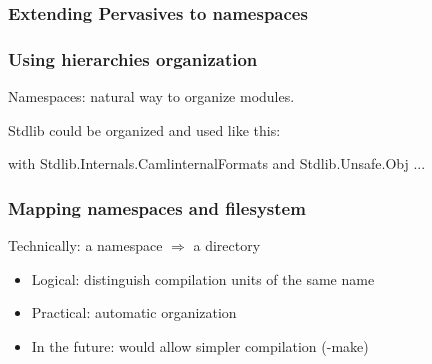 \documentclass{beamer}
\begin{document}
\begin{frame}[fragile]
\frametitle{Extending Pervasives to namespaces}






\end{frame}

\begin{frame}[fragile]
\frametitle{Using hierarchies organization}
Namespaces: natural way to organize modules.

\medskip
\pause

Stdlib could be organized and used like this:
\begin{OCaml}
with Stdlib.Internals.CamlinternalFormats
and Stdlib.Unsafe.Obj
...
\end{OCaml}
\end{frame}

\begin{frame}
\frametitle{Mapping namespaces and filesystem}

Technically: a namespace $\Rightarrow$ a directory

\medskip

\pause

\begin{itemize}[<+->]
\item Logical: distinguish compilation units of the same name
\item Practical: automatic organization
\item In the future: would allow simpler compilation (-make)
\end{itemize}

\end{frame}
\end{document}
